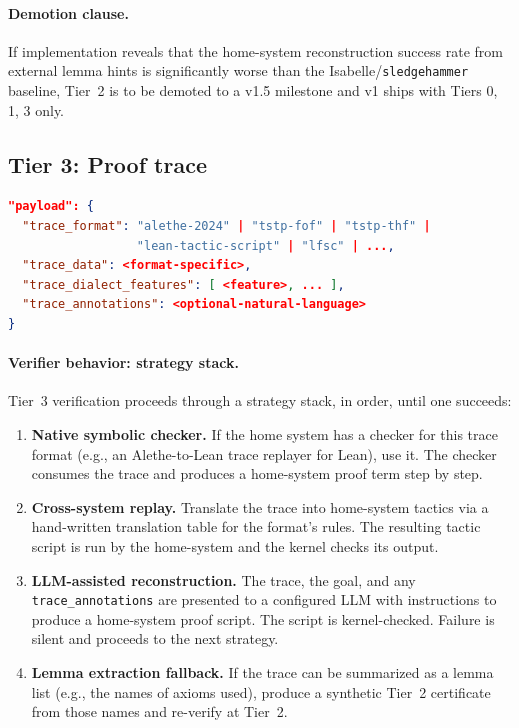 \documentclass[11pt,letterpaper]{article}
\theoremstyle{definition}
\theoremstyle{remark}
\begin{document}
\paragraph{Demotion clause.} If implementation reveals that the
home-system reconstruction success rate from external lemma hints is
significantly worse than the Isabelle/\texttt{sledgehammer} baseline,
Tier~2 is to be demoted to a v1.5 milestone and v1 ships with Tiers
0, 1, 3 only.

\subsection{Tier 3: Proof trace}

\begin{lstlisting}[language=json]
"payload": {
  "trace_format": "alethe-2024" | "tstp-fof" | "tstp-thf" |
                  "lean-tactic-script" | "lfsc" | ...,
  "trace_data": <format-specific>,
  "trace_dialect_features": [ <feature>, ... ],
  "trace_annotations": <optional-natural-language>
}
\end{lstlisting}

\paragraph{Verifier behavior: strategy stack.} Tier~3 verification
proceeds through a strategy stack, in order, until one succeeds:

\begin{enumerate}[leftmargin=2em]
  \item \textbf{Native symbolic checker.} If the home system has a
        checker for this trace format (e.g., an Alethe-to-Lean trace
        replayer for Lean), use it. The checker consumes the trace and
        produces a home-system proof term step by step.
  \item \textbf{Cross-system replay.} Translate the trace into
        home-system tactics via a hand-written translation table for
        the format's rules. The resulting tactic script is run by the
        home-system and the kernel checks its output.
  \item \textbf{LLM-assisted reconstruction.} The trace, the goal, and
        any \texttt{trace\_annotations} are presented to a configured
        LLM with instructions to produce a home-system proof script.
        The script is kernel-checked. Failure is silent and proceeds to
        the next strategy.
  \item \textbf{Lemma extraction fallback.} If the trace can be summarized
        as a lemma list (e.g., the names of axioms used), produce a
        synthetic Tier~2 certificate from those names and re-verify at
        Tier~2.
\end{enumerate}
\end{document}
